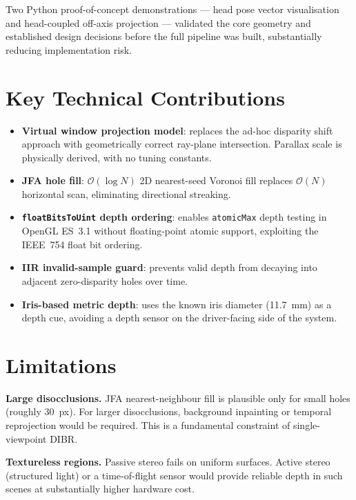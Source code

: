 \documentclass[11pt, a4paper]{report}
\begin{document}
Two Python proof-of-concept demonstrations --- head pose vector
visualisation and head-coupled off-axis projection --- validated the core
geometry and established design decisions before the full pipeline was
built, substantially reducing implementation risk.

\section{Key Technical Contributions}

\begin{itemize}[noitemsep]
    \item \textbf{Virtual window projection model}: replaces the
          ad-hoc disparity shift approach with geometrically correct
          ray-plane intersection.
          Parallax scale is physically derived, with no tuning constants.
    \item \textbf{JFA hole fill}: $\mathcal{O}(\log N)$ 2D nearest-seed
          Voronoi fill replaces $\mathcal{O}(N)$ horizontal scan,
          eliminating directional streaking.
    \item \textbf{\texttt{floatBitsToUint} depth ordering}: enables
          \texttt{atomicMax} depth testing in OpenGL ES~3.1 without
          floating-point atomic support, exploiting the IEEE~754 float
          bit ordering.
    \item \textbf{IIR invalid-sample guard}: prevents valid depth from
          decaying into adjacent zero-disparity holes over time.
    \item \textbf{Iris-based metric depth}: uses the known iris diameter
          (11.7~mm) as a depth cue, avoiding a depth sensor on the
          driver-facing side of the system.
\end{itemize}

\section{Limitations}

\textbf{Large disocclusions.}
JFA nearest-neighbour fill is plausible only for small holes
(roughly 30~px).
For larger disocclusions, background inpainting or temporal reprojection
would be required.
This is a fundamental constraint of single-viewpoint DIBR.

\textbf{Textureless regions.}
Passive stereo fails on uniform surfaces.
Active stereo (structured light) or a time-of-flight sensor would
provide reliable depth in such scenes at substantially higher hardware
cost.
\end{document}
